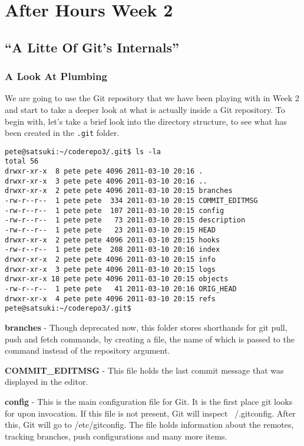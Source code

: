 \chapter{After Hours Week 2}
\section{``A Litte Of Git's Internals''}
\subsection{A Look At Plumbing}

We are going to use the Git repository that we have been playing with in Week 2 and start to take a deeper look at what is actually inside a Git repository.  To begin with, let's take a brief look into the directory structure, to see what has been created in the \texttt{.git} folder.

\begin{Verbatim}[frame=leftline,framerule=1mm,fontsize=\relsize{-3}] 
pete@satsuki:~/coderepo3/.git$ ls -la
total 56
drwxr-xr-x  8 pete pete 4096 2011-03-10 20:16 .
drwxr-xr-x  3 pete pete 4096 2011-03-10 20:16 ..
drwxr-xr-x  2 pete pete 4096 2011-03-10 20:15 branches
-rw-r--r--  1 pete pete  334 2011-03-10 20:15 COMMIT_EDITMSG
-rw-r--r--  1 pete pete  107 2011-03-10 20:15 config
-rw-r--r--  1 pete pete   73 2011-03-10 20:15 description
-rw-r--r--  1 pete pete   23 2011-03-10 20:15 HEAD
drwxr-xr-x  2 pete pete 4096 2011-03-10 20:15 hooks
-rw-r--r--  1 pete pete  208 2011-03-10 20:16 index
drwxr-xr-x  2 pete pete 4096 2011-03-10 20:15 info
drwxr-xr-x  3 pete pete 4096 2011-03-10 20:15 logs
drwxr-xr-x 18 pete pete 4096 2011-03-10 20:15 objects
-rw-r--r--  1 pete pete   41 2011-03-10 20:16 ORIG_HEAD
drwxr-xr-x  4 pete pete 4096 2011-03-10 20:15 refs
pete@satsuki:~/coderepo3/.git$ 

\end{Verbatim} 

\textbf{branches} - Though deprecated now, this folder stores shorthands for git pull, push and fetch commands, by creating a file, the name of which is passed to the command instead of the repository argument.

\textbf{COMMIT\_EDITMSG} - This file holds the last commit message that was displayed in the editor.

\textbf{config} - This is the main configuration file for Git.  It is the first place git looks for upon invocation.  If this file is not present, Git will inspect ~/.gitconfig.  After this, Git will go to /etc/gitconfig.  The file holds information about the remotes, tracking branches, push configurations and many more items.

